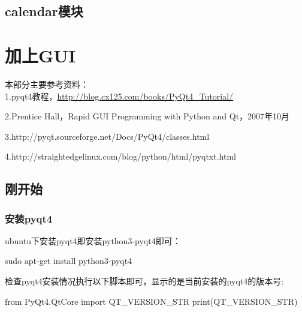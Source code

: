 \documentclass[12pt,oneside]{book}
\begin{document}
\begin{common-format}
\chapter{calendar模块}



\part{加上GUI}
本部分主要参考资料：\\
1.pyqt4教程，\href{http://blog.cx125.com/books/PyQt4_Tutorial/}{http://blog.cx125.com/books/PyQt4\_{}Tutorial/}

2.Prentice Hall，Rapid GUI Programming with Python and Qt，2007年10月

3.http://pyqt.sourceforge.net/Docs/PyQt4/classes.html

4.http://straightedgelinux.com/blog/python/html/pyqtxt.html



\chapter{刚开始}

\section{安装pyqt4}
ubuntu下安装pyqt4即安装python3-pyqt4即可：
\begin{tcbbash}[]
sudo apt-get install python3-pyqt4
\end{tcbbash}

检查pyqt4安装情况执行以下脚本即可，显示的是当前安装的pyqt4的版本号:
\begin{tcbpython}[]
from PyQt4.QtCore import QT_VERSION_STR
print(QT_VERSION_STR)
\end{tcbpython}



\end{common-format}
\end{document}
